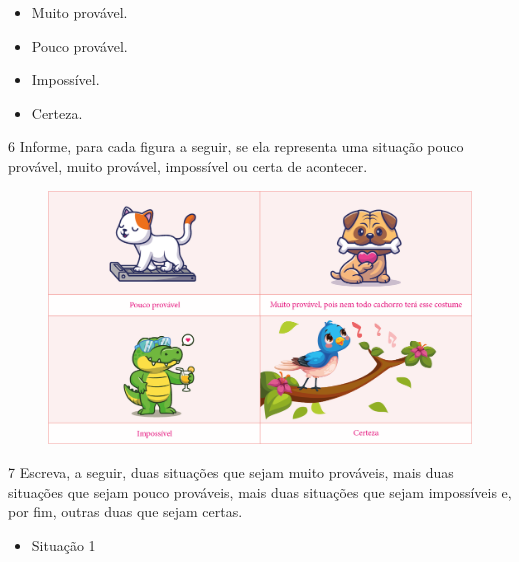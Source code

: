 \pagebreak
\begin{itemize}
\item Muito provável.

\item Pouco provável.

\item Impossível.

\item Certeza.
\end{itemize}

\pagebreak
\num{6} Informe, para cada figura a seguir, se ela representa uma situação pouco
provável, muito provável, impossível ou certa de acontecer.

\begin{figure}[htpb!]
\includegraphics[width=\textwidth]{./media/image88.png}
\end{figure}

\num{7} Escreva, a seguir, duas situações que sejam muito prováveis, mais duas
situações que sejam pouco prováveis, mais duas situações que sejam
impossíveis e, por fim, outras duas que sejam certas.




\begin{itemize}
\item Situação 1
\end{itemize}

